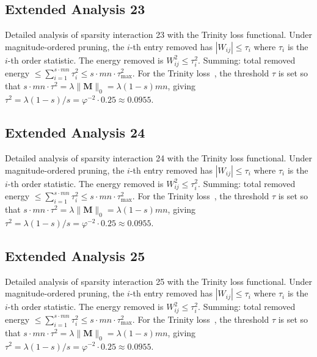 \subsection{Extended Analysis 23}
\label{subsec:ext-23}

Detailed analysis of sparsity interaction 23 with the Trinity
loss functional.  Under magnitude-ordered pruning, the $i$-th entry removed has
$|W_{ij}| \leq \tau_i$ where $\tau_i$ is the $i$-th order statistic.  The
energy removed is $W_{ij}^2 \leq \tau_i^2$.  Summing: total removed energy
$\leq \sum_{i=1}^{s \cdot mn} \tau_i^2 \leq s \cdot mn \cdot \tau_{\max}^2$.
For the Trinity loss~\cite{hanetal2015deep}, the threshold $\tau$ is set so that
$s \cdot mn \cdot \tau^2 = \lambda \|\mathbf{M}\|_0 = \lambda (1-s) mn$, giving
$\tau^2 = \lambda(1-s)/s = \varphi^{-2} \cdot 0.25 \approx 0.0955$.


\subsection{Extended Analysis 24}
\label{subsec:ext-24}

Detailed analysis of sparsity interaction 24 with the Trinity
loss functional.  Under magnitude-ordered pruning, the $i$-th entry removed has
$|W_{ij}| \leq \tau_i$ where $\tau_i$ is the $i$-th order statistic.  The
energy removed is $W_{ij}^2 \leq \tau_i^2$.  Summing: total removed energy
$\leq \sum_{i=1}^{s \cdot mn} \tau_i^2 \leq s \cdot mn \cdot \tau_{\max}^2$.
For the Trinity loss~\cite{hanetal2015deep}, the threshold $\tau$ is set so that
$s \cdot mn \cdot \tau^2 = \lambda \|\mathbf{M}\|_0 = \lambda (1-s) mn$, giving
$\tau^2 = \lambda(1-s)/s = \varphi^{-2} \cdot 0.25 \approx 0.0955$.


\subsection{Extended Analysis 25}
\label{subsec:ext-25}

Detailed analysis of sparsity interaction 25 with the Trinity
loss functional.  Under magnitude-ordered pruning, the $i$-th entry removed has
$|W_{ij}| \leq \tau_i$ where $\tau_i$ is the $i$-th order statistic.  The
energy removed is $W_{ij}^2 \leq \tau_i^2$.  Summing: total removed energy
$\leq \sum_{i=1}^{s \cdot mn} \tau_i^2 \leq s \cdot mn \cdot \tau_{\max}^2$.
For the Trinity loss~\cite{hanetal2015deep}, the threshold $\tau$ is set so that
$s \cdot mn \cdot \tau^2 = \lambda \|\mathbf{M}\|_0 = \lambda (1-s) mn$, giving
$\tau^2 = \lambda(1-s)/s = \varphi^{-2} \cdot 0.25 \approx 0.0955$.


